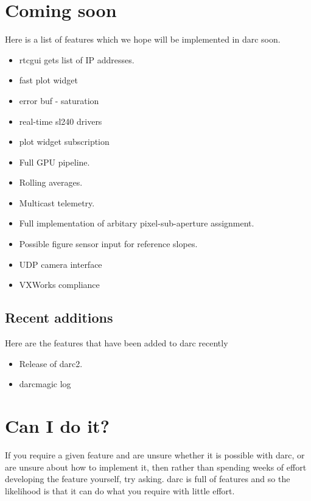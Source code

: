 \documentclass[a4,10pt]{article}
\begin{document}
\section{Coming soon}
Here is a list of features which we hope will be implemented in darc
soon.

\begin{itemize}
\item rtcgui gets list of IP addresses.
\item fast plot widget
\item error buf - saturation
\item real-time sl240 drivers
\item plot widget subscription
\item Full GPU pipeline.
\item Rolling averages.
\item Multicast telemetry.
\item Full implementation of arbitary pixel-sub-aperture assignment.
\item Possible figure sensor input for reference slopes.
\item UDP camera interface
\item VXWorks compliance
\end{itemize}

\subsection{Recent additions}
Here are the features that have been added to darc recently
\begin{itemize}
\item Release of darc2.
\item darcmagic log
\end{itemize}

\section{Can I do it?}
If you require a given feature and are unsure whether it is possible
with darc, or are unsure about how to implement it, then rather than
spending weeks of effort developing the feature yourself, try asking.
darc is full of features and so the likelihood is that it can do what
you require with little effort.
\end{document}
